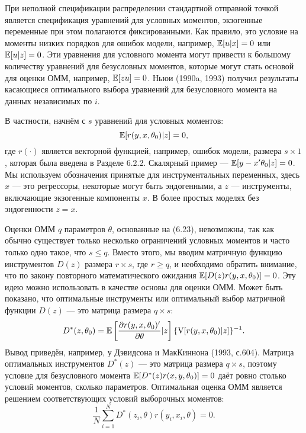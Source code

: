 При неполной спецификации распределении стандартной отправной точкой является спецификация уравнений для условных моментов, экзогенные переменные при этом полагаются фиксированными. Как правило, это условие на моменты низких порядков для ошибок модели, например, $\mathbb{E}[u|x]=0$ или $\mathbb{E}[u|z]=0$. Эти уравнения для условного момента могут привести к большому количеству уравнений для безусловных моментов, которые могут стать основой для оценки ОММ, например, $\mathbb{E}[zu]=0$. Ньюи (1990a, 1993) получил результаты касающиеся оптимального выбора уравнений для безусловного момента на данных независимых по $i$.

В частности, начнём с $s$ уравнений для условных моментов:
\begin{equation}
\mathbb{E}[r(y,x,\theta_0)|z]=0,
\end{equation}
где $r(\cdot)$ является векторной функцией, например, ошибок модели, размера $s \times 1$, которая была введена в Разделе 6.2.2. Скалярный пример --- $\mathbb{E}[y-x'\theta_0|z] = 0$. Мы используем обозначения принятые для инструментальных переменных, здесь $x$ --- это регрессоры, некоторые могут быть  эндогенными, а $z$ --- инструменты, включающие экзогенные компоненты $x$. В более простых моделях без эндогенности $z=x$.

Оценки ОММ $q$ параметров $\theta$, основанные на (6.23), невозможны, так как обычно существует только несколько ограничений условных моментов и часто только одно такое, что $s \le q$. Вместо этого, мы вводим матричную функцию инструментов $D(z)$ размера $r \times s$, где $r \ge q$, и необходимо обратить внимание, что по закону повторного математического ожидания $\mathbb{E}[D(z)r(y,x,\theta_0)]=0$. Эту идею можно использовать в качестве основы для оценки ОММ. Может быть показано, что оптимальные инструменты или оптимальный выбор матричной функции $D(z)$ --- это матрица размера $q \times s$:
\begin{equation}
D^*(z,\theta_0)=\mathbb{E} \left[ \frac{\partial r(y,x,\theta_0)'}{\partial \theta}|z \right] \{ \mathrm{V}[r(y,x,\theta_0)|z]\}^{-1}.
\end{equation}
Вывод приведён, например, у Дэвидсона и МакКиннона (1993, с.604). Матрица оптимальных инструментов $D^*(z)$ --- это матрица размера $q \times s$, поэтому условие для безусловного момента $\mathbb{E}[D^*(z) r(x,y,\theta_0)]=0$ даёт ровно столько условий моментов, сколько параметров. Оптимальная оценка ОММ является решением соответствующих условий выборочных моментов:
\begin{equation}
\frac{1}{N} \sum_{i=1}^{N} D^*(z_i,\theta) r(y_i,x_i,\theta)=0.
\end{equation}

